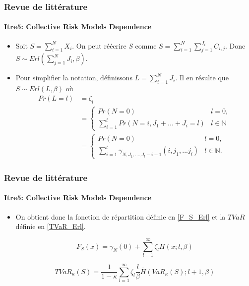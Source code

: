 \documentclass[11pt]{beamer}
\begin{document}
\begin{frame}
	\frametitle{Revue de littérature}
	\framesubtitle{Itre5: Collective Risk Models Dependence \cite{Itre5}}
	
	\begin{itemize}
		\item Soit $S = \sum_{i=1}^{N} X_i$. On peut réécrire $S$ comme $S = \sum_{i=1}^{N} \sum_{j=1}^{J_i} C_{i,j}$. Donc  $S \sim Erl(\sum_{j=1}^{N} J_i, \beta)$.
		
		\item Pour simplifier la notation, définissons $L= \sum_{i=1}^{N} J_i$. Il en résulte que $S \sim Erl(L, \beta)$ où
		\begin{align*}\label{zeta_l}
		Pr(L=l) &= \zeta_l  \\
		&= \left\{
				\begin{array}{ll}
				Pr(N=0)										& l=0, \\
				\sum_{i=1}^{l} Pr(N=i, J_1 + ... + J_i = l)	& l \in \mathbb{N}
				\end{array} 
			\right.\\
		&= \left\{
		\begin{array}{ll}
		Pr(N=0)														& l=0, \\
		\sum_{i=1}^{l} \gamma_{N, J_1,...,J_l-i+1}(i, j_1,...j_i)	& l \in \mathbb{N}.
		\end{array} 
		\right.			
		\end{align*}
		
	\end{itemize}

\end{frame}

\begin{frame}
	\frametitle{Revue de littérature}
	\framesubtitle{Itre5: Collective Risk Models Dependence \cite{Itre5}}
		\begin{itemize}
			\item On obtient donc la fonction de répartition définie en \eqref{F_S_Erl} et la $TVaR$ définie en \eqref{TVaR_Erl}.
			
			\begin{equation}\label{F_S_Erl}
			F_S(x) = \gamma_N(0) + \sum_{l=1}^{\infty} \zeta_l H(x; l, \beta)
			\end{equation}
			
			\begin{equation}\label{TVaR_Erl}
			TVaR_{\kappa}(S) = \frac{1}{1-\kappa} \sum_{l=1}^{\infty} \zeta_l \frac{l}{\beta} \bar{H}(VaR_{\kappa}(S); l + 1, \beta)
			\end{equation}
		\end{itemize}

\end{frame}
\end{document}
